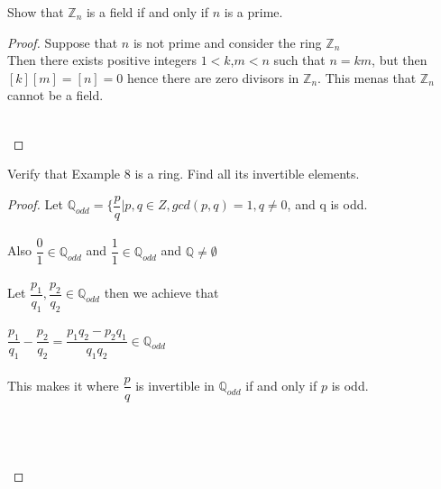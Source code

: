 \documentclass[12pt]{article}
\newenvironment{problem}[2][Problem]{\begin{trivlist}
\item[\hskip \labelsep {\bfseries #1}\hskip \labelsep {\bfseries #2.}]}{\end{trivlist}}
\begin{document}
\begin{problem}{4.1.3}
Show that $\mathbb{Z}_n$ is a field if and only if $n$ is a prime.
\end{problem}

\begin{proof}
Suppose that $n$ is not prime and consider the ring $\mathbb{Z}_n$ \\ 
Then there exists positive integers $1<k$,$m<n$ such that $n=km$, but then $[k][m]=[n]=0$ hence there are zero divisors in $\mathbb{Z}_n$. This menas that $\mathbb{Z}_n$ cannot be a field. \\ \\
\centerline{}
\end{proof}
 
\begin{problem}{4.1.4}
Verify that Example 8 is a ring. Find all its invertible elements. 
\end{problem}

\begin{proof} 
Let $\mathbb{Q}_{odd} = \{ \dfrac{p}{q} | p,q \in Z, gcd(p,q)=1, q\neq 0$, and q is odd. \\ \\
Also $\dfrac{0}{1} \in \mathbb{Q}_{odd}$ and $\dfrac{1}{1} \in \mathbb{Q}_{odd}$ and $\mathbb{Q} \neq \emptyset$ \\ \\
Let $\dfrac{p_1}{q_1}, \dfrac{p_2}{q_2} \in \mathbb{Q}_{odd}$ then we achieve that \\ \\
$\dfrac{p_1}{q_1} -  \dfrac{p_2}{q_2} = \dfrac{p_1q_2-p_2q_1}{q_1q_2} \in \mathbb{Q}_{odd}$ \\ \\
This makes it where $\dfrac{p}{q}$ is invertible in $\mathbb{Q}_{odd}$ if and only if $p$ is odd. \\ \\
\centerline{} \\ \\
\end{proof}
\end{document}
